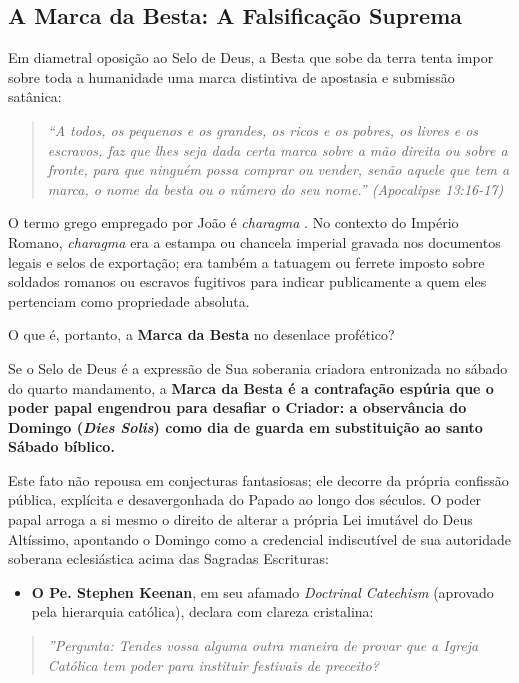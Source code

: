 \subsection{A Marca da Besta: A Falsificação Suprema}


Em diametral oposição ao Selo de Deus, a Besta que sobe da terra tenta impor sobre toda a humanidade uma marca distintiva de apostasia e submissão satânica:


\begin{quote}
\itshape \textit{``A todos, os pequenos e os grandes, os ricos e os pobres, os livres e os escravos, faz que lhes seja dada certa marca sobre a mão direita ou sobre a fronte, para que ninguém possa comprar ou vender, senão aquele que tem a marca, o nome da besta ou o número do seu nome.''} (Apocalipse 13:16-17)
\end{quote}


O termo grego empregado por João é \textit{charagma} . No contexto do Império Romano, \textit{charagma} era a estampa ou chancela imperial gravada nos documentos legais e selos de exportação; era também a tatuagem ou ferrete imposto sobre soldados romanos ou escravos fugitivos para indicar publicamente a quem eles pertenciam como propriedade absoluta.

O que é, portanto, a \textbf{Marca da Besta} no desenlace profético?

Se o Selo de Deus é a expressão de Sua soberania criadora entronizada no sábado do quarto mandamento, a \textbf{Marca da Besta é a contrafação espúria que o poder papal engendrou para desafiar o Criador: a observância do Domingo (\textit{Dies Solis}) como dia de guarda em substituição ao santo Sábado bíblico.}

Este fato não repousa em conjecturas fantasiosas; ele decorre da própria confissão pública, explícita e desavergonhada do Papado ao longo dos séculos. O poder papal arroga a si mesmo o direito de alterar a própria Lei imutável do Deus Altíssimo, apontando o Domingo como a credencial indiscutível de sua autoridade soberana eclesiástica acima das Sagradas Escrituras:

\begin{itemize}
  \item \textbf{O Pe. Stephen Keenan}, em seu afamado \textit{Doctrinal Catechism} (aprovado pela hierarquia católica), declara com clareza cristalina:
\end{itemize}


\begin{quote}
\itshape \textit{''Pergunta: Tendes vossa alguma outra maneira de provar que a Igreja Católica tem poder para instituir festivais de preceito?}
\end{quote}


